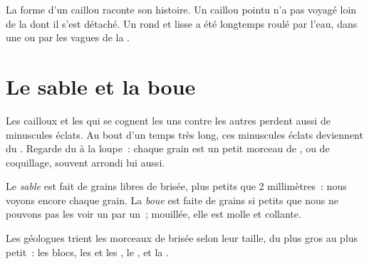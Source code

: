 \begin{remark}\label{rem:g3:stones-pebbles-sand:shape}
La forme d'un caillou raconte son histoire. Un caillou pointu n'a pas
voyagé loin de la  dont il s'est détaché. Un  rond et lisse a
été longtemps roulé par l'eau, dans une  ou par les vagues de la .
\end{remark}

\section{Le sable et la boue}

Les cailloux et les  qui se cognent les uns contre les autres
perdent aussi de minuscules éclats. Au bout d'un temps très long, ces
minuscules éclats deviennent du . Regarde du  à la loupe~:
chaque grain est un petit morceau de , ou de coquillage, souvent
arrondi lui aussi.

\begin{definition}\label{def:g3:stones-pebbles-sand:sand}
Le \emph{sable} est fait de grains libres de  brisée,
plus petits que 2 millimètres~: nous voyons encore chaque grain. La
\emph{boue} est faite de grains si petits que nous ne pouvons
pas les voir un par un~; mouillée, elle est molle et collante.
\end{definition}

Les géologues trient les morceaux de  brisée selon leur taille, du
plus gros au plus petit~: les blocs, les  et les , le ,
et la .

